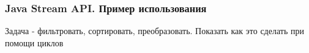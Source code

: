 \begin{frame}
\frametitle{Java Stream API. Пример использования} %
Задача - фильтровать, сортировать, преобразовать. Показать как это сделать при помощи циклов
\end{frame}